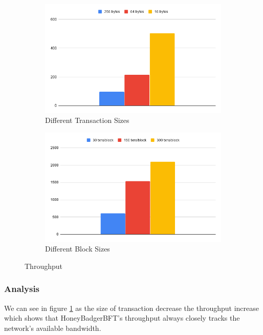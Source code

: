 \begin{figure}
\centering
\begin{subfigure}{.5\textwidth}
  \centering
  \includegraphics[width=1\linewidth]{images/tps_txnsize.png}
  \caption{Different Transaction Sizes}
  \label{fig:diff_txns}
\end{subfigure}%
\begin{subfigure}{.5\textwidth}
  \centering
  \includegraphics[width=1\linewidth]{images/tps_blocksize.png}
  \caption{Different Block Sizes}
  \label{fig:diff_batch}
\end{subfigure}
\caption{Throughput}
\label{fig:test}
\end{figure}
\subsubsection{Analysis}
We can see in figure \ref{fig:diff_txns} as the size of transaction decrease the throughput increase which shows that HoneyBadgerBFT’s throughput always closely tracks the network’s available bandwidth.


